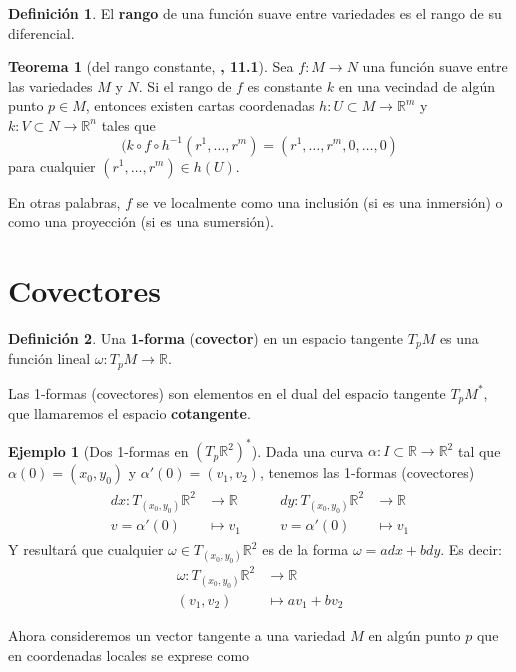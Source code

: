 \documentclass[spanish]{book}
\theoremstyle{definition}
\newtheorem*{defn}{Definición}
\newtheorem*{teo}{Teorema}
\newtheorem*{ejem}{Ejemplo}
\newcommand{\R}{\mathbb{R}}
\begin{document}
	\begin{defn}
		El \textbf{rango} de una función suave entre variedades es el rango de su diferencial.
	\end{defn}
	\begin{teo}[del rango constante, \cite{Loring}\textbf{, 11.1}]
		Sea $f:M\to N$ una función suave entre las variedades $M$ y $N$. Si el rango de $f$ es constante $k$ en una vecindad de algún punto $p\in M$, entonces existen cartas coordenadas $h:U\subset M\to\R^m$ y $k:V\subset N\to\R^n$ tales que
		\[(k\circ f\circ h^{-1}(r^1,\ldots,r^m)=(r^1,\ldots,r^m,0,\ldots,0)\]
		para cualquier $(r^1,\ldots,r^m)\in h(U)$.
	\end{teo}
	En otras palabras, $f$ se ve localmente como una inclusión (si es una inmersión) o como una proyección (si es una sumersión).
	\section{Covectores}
	\begin{defn}
		Una \textbf{1-forma} (\textbf{covector}) en un espacio tangente $T_pM$ es una función lineal $\omega:T_pM\to\R$.
	\end{defn}
	Las 1-formas (covectores) son elementos en el dual del espacio tangente $T_pM^*$, que llamaremos el espacio \textbf{cotangente}.
	\begin{ejem}[Dos 1-formas en $(T_p\R^2)^*$]
		Dada una curva $\alpha:I\subset\R\to\R^2$ tal que $\alpha(0)=(x_0,y_0)$ y $\alpha'(0)=(v_1,v_2)$, tenemos las 1-formas (covectores)
		\begin{align*}
			\begin{aligned}
				dx:T_{(x_0,y_0)}\R^2&\to\R\\
				v=\alpha'(0)&\mapsto v_1
			\end{aligned}
			\qquad
			\begin{aligned}
				dy:T_{(x_0,y_0)}\R^2&\to\R\\
				v=\alpha'(0)&\mapsto v_1
			\end{aligned}
		\end{align*}
		Y resultará que cualquier $\omega\in T_(x_0,y_0)\R^2$ es de la forma $\omega=adx+bdy$. Es decir:
		\begin{align*}
			\omega:T_{(x_0,y_0)}\R^2&\to\R\\
			(v_1,v_2)&\mapsto av_1+bv_2
		\end{align*}
	\end{ejem}
	Ahora consideremos un vector tangente a una variedad $M$ en algún punto $p$ que en coordenadas locales se exprese como
\end{document}
